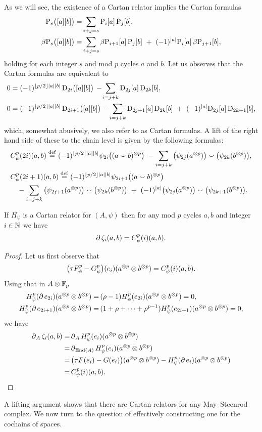As we will see, the existence of a Cartan relator implies the Cartan formulas
\begin{align*}
	\mathrm{P}_s\big([a][b]\big) =&
	\sum_{i+j=s} \mathrm{P}_i[a] \, \mathrm{P}_j[b], \\
	\beta\mathrm{P}_s\big([a][b]\big) =&
	\sum_{i+j=s} \beta\mathrm{P}_{i+1}[a] \, \mathrm{P}_j[b] \ +\ (-1)^{\lvert a\rvert} \mathrm{P}_i[a] \, \beta\mathrm{P}_{j+1}[b],
\end{align*}
holding for each integer $s$ and mod $p$ cycles $a$ and $b$.
Let us observes that the Cartan formulas are equivalent to
\begin{align*}
	0 &= (-1)^{\floor{p/2}\bars{a}\bars{b}} \, \rD_{2i}\big([a][b]\big) \,-\!
	\sum_{i=j+k} \rD_{2j}[a] \, \rD_{2k}[b], \\
	0 &= (-1)^{\floor{p/2}\bars{a}\bars{b}} \, \rD_{2i+1}\big([a][b]\big) \,-\!
	\sum_{i=j+k} \rD_{2j+1}[a] \, \rD_{2k}[b] \ +\ (-1)^{\bars{a}}\rD_{2j}[a] \, \rD_{2k+1}[b],
\end{align*}
which, somewhat abusively, we also refer to as Cartan formulas.
A lift of the right hand side of these to the chain level is given by the following formulas:
\begin{align*}
	&C_\psi^p(2i)(a,b) \stackrel{\mathrm{def}}{=} (-1)^{\lfloor p/2\rfloor\lvert a\rvert\lvert b\rvert} \psi_{2i}\big((a \smallsmile b)^{\otimes p}\big) \ -
	\sum_{i=j+k}\big(\psi_{2j}(a^{\otimes p})\big) \smallsmile \big(\psi_{2k}(b^{\otimes p})\big), \\
	&C_\psi^p(2i+1)(a,b) \stackrel{\mathrm{def}}{=} (-1)^{\lfloor p/2\rfloor\lvert a\rvert\lvert b\rvert} \psi_{2i+1}\big((a \smallsmile b)^{\otimes p}\big) \\
	&\quad -\sum_{i=j+k} \big(\psi_{2j+1}(a^{\otimes p})\big) \smallsmile \big(\psi_{2k}(b^{\otimes p})\big)\ +\
	(-1)^{\lvert a\rvert}\big(\psi_{2j}(a^{\otimes p})\big) \smallsmile \big(\psi_{2k+1}(b^{\otimes p})\big).
\end{align*}

\begin{theorem*}
	If $H_\psi$ is a Cartan relator for $(A, \psi)$ then for any mod $p$ cycles $a,b$ and integer $i \in \mathbb{N}$ we have
	\[
	\operatorname{\partial} \zeta_i(a,b) = C_\psi^p(i)(a, b).
	\]
\end{theorem*}

\begin{proof}
	Let us first observe that
	\[
	\big(\tau F_\psi^p - G_\psi^p\big)(e_i)(a^{\otimes p} \otimes b^{\otimes p}) = C^p_\psi(i)(a,b).
	\]
	Using that in $A \otimes {\mathbb{F}_p}$
	\begin{align*}
		H_\psi^p(\operatorname{\partial} e_{2i})(a^{\otimes p} \otimes b^{\otimes p}) =&\,
		(\rho - 1) H_\psi^p(e_{2i})(a^{\otimes p} \otimes b^{\otimes p}) = 0, \\
		H_\psi^p(\operatorname{\partial} e_{2i+1})(a^{\otimes p} \otimes b^{\otimes p}) =&\,
		(1+\rho+\dots+\rho^{p-1}) H_\psi^p(e_{2i+1})(a^{\otimes p} \otimes b^{\otimes p}) = 0,
	\end{align*}
	we have
	\begin{align*}
		\operatorname{\partial}_A \zeta_i(a,b) =&
		\operatorname{\partial}_A H_\psi^p(e_i)(a^{\otimes p} \otimes b^{\otimes p}) \\ =&
		\operatorname{\partial}_{\mathrm{End}(A)} H_\psi^p(e_i)(a^{\otimes p} \otimes b^{\otimes p}) \\ =& \,
		\big(\tau F(e_i) - G(e_i)\big)(a^{\otimes p} \otimes b^{\otimes p}) -
		H_\psi^p(\operatorname{\partial} e_i)(a^{\otimes p} \otimes b^{\otimes p}) \\ =&\,
		C^p_\psi(i)(a,b).\qedhere
	\end{align*}
\end{proof}

A lifting argument shows that there are Cartan relators for any May--Steenrod complex.
We now turn to the question of effectively constructing one for the cochains of spaces.